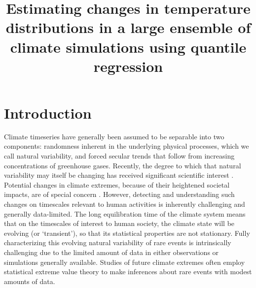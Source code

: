 \documentclass{ametsoc}
\title{Estimating changes in temperature distributions in a large ensemble of climate simulations using quantile regression}
\affiliation{University of Chicago, Chicago, USA}
\begin{document}
	
\maketitle

\section{Introduction}

Climate timeseries have generally been assumed to be separable into two components: randomness inherent in the underlying physical processes, which we call natural variability, and forced secular trends that follow from increasing concentrations of greenhouse gases.
Recently, the degree to which that natural variability may itself be changing has received significant scientific interest \citep[e.g.][]{trenberth2011attribution, donat2012shifting,deser2012communication, thompson2015quantifying, kay2015community}. Potential changes in climate extremes, because of their heightened societal impacts, are of special concern \citep[e.g.][]{davison1990models, stott2004human, chavez2005generalized, eastoe2009modelling, otto2012reconciling, swain2014extraordinary, singh2014severe, trenberth2015attribution, diffenbaugh2015anthropogenic, huang2015changes, jalbert2017spatiotemporal}. 
However, detecting and understanding such changes on timescales relevant to human activities is inherently challenging and generally data-limited.
The long equilibration time of the climate system means that on the timescales of interest to human society, the climate state will be evolving (or `transient'), so that its statistical properties are not stationary. Fully characterizing this evolving natural  variability of rare events is intrinsically challenging due to the limited amount of data in either observations or simulations generally available. Studies of future climate extremes often employ statistical extreme value theory to make inferences about rare events with modest amounts of data.
\end{document}
